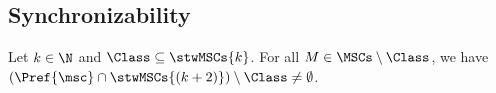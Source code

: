 \begin{comment}
\[\begin{array}{rl}
&\onenL{\System} \cap \stwMSCs{k} \subseteq L(\phi)\\[1ex]
\Longleftrightarrow &\ppL{\System} \cap L(\onenformula) \cap \stwMSCs{k} \subseteq L(\phi)\\[1ex]
\Longleftrightarrow &\ppL{\System} \cap \stwMSCs{k} \subseteq L(\phi) \cup L(\neg \onenformula)\\[1ex]
\Longleftrightarrow &\ppL{\System} \cap \stwMSCs{k} \subseteq L(\phi \vee \neg \onenformula)\,.
\end{array}\]
The latter is decidable due to Fact~\ref{p2p}.
\end{proof}

\begin{theorem}
	\label{thm:nn_bounded_model_checking}
	The bounded model-checking problem for $\comsymb =  \nnsymb$ is decidable.
\end{theorem}
\begin{proof}
By Proposition~\ref{prop:nn_mso}, $\nnMSCs=L(\nnformula)$. Given a system $\System$, we have that $\nnL{\System} = \ppL{\System} \cap L(\nnformula)$. Therefore, we can rewrite the bounded model checking problem for $\comsymb = \nnsymb$ as

\[\begin{array}{rl}
&\nnL{\System} \cap \stwMSCs{k} \subseteq L(\phi)\\[1ex]
\Longleftrightarrow &\ppL{\System} \cap L(\nnformula) \cap \stwMSCs{k} \subseteq L(\phi)\\[1ex]
\Longleftrightarrow &\ppL{\System} \cap \stwMSCs{k} \subseteq L(\phi) \cup L(\neg \nnformula)\\[1ex]
\Longleftrightarrow &\ppL{\System} \cap \stwMSCs{k} \subseteq L(\phi \vee \neg \nnformula)\,.
\end{array}\]
The latter is decidable due to Fact~\ref{p2p}.
\end{proof}

\end{comment}

\subsection{Synchronizability}

\begin{proposition}\label{lem:pref_stw_k+2}
	Let $k \in \N$ and $\Class \subseteq \stwMSCs{k}$. For all
	$M \in \MSCs \setminus \Class$, we have
	$(\Pref{\msc} \cap \stwMSCs{(k+2)}) \setminus \Class \neq \emptyset$.
\end{proposition}

